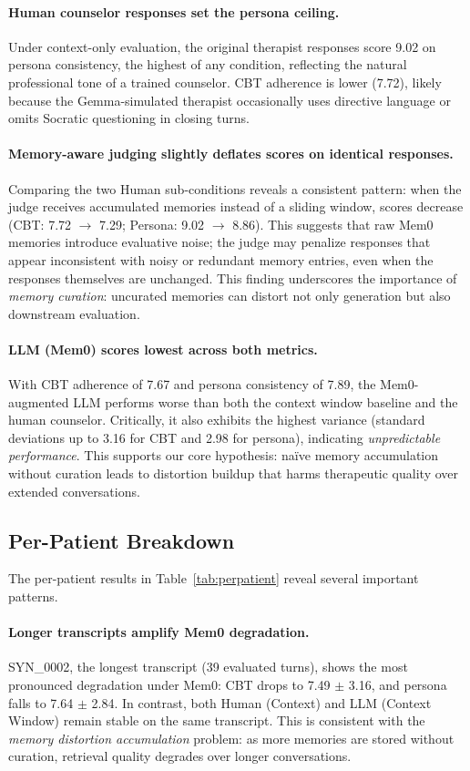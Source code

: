 \paragraph{Human counselor responses set the persona ceiling.} Under context-only evaluation, the original therapist responses score 9.02 on persona consistency, the highest of any condition, reflecting the natural professional tone of a trained counselor. CBT adherence is lower (7.72), likely because the Gemma-simulated therapist occasionally uses directive language or omits Socratic questioning in closing turns.

\paragraph{Memory-aware judging slightly deflates scores on identical responses.} Comparing the two Human sub-conditions reveals a consistent pattern: when the judge receives accumulated memories instead of a sliding window, scores decrease (CBT: 7.72 $\to$ 7.29; Persona: 9.02 $\to$ 8.86). This suggests that raw Mem0 memories introduce evaluative noise; the judge may penalize responses that appear inconsistent with noisy or redundant memory entries, even when the responses themselves are unchanged. This finding underscores the importance of \emph{memory curation}: uncurated memories can distort not only generation but also downstream evaluation.

\paragraph{LLM (Mem0) scores lowest across both metrics.} With CBT adherence of 7.67 and persona consistency of 7.89, the Mem0-augmented LLM performs worse than both the context window baseline and the human counselor. Critically, it also exhibits the highest variance (standard deviations up to 3.16 for CBT and 2.98 for persona), indicating \emph{unpredictable performance}. This supports our core hypothesis: na\"ive memory accumulation without curation leads to distortion buildup that harms therapeutic quality over extended conversations.

\subsection{Per-Patient Breakdown}

The per-patient results in Table~\ref{tab:perpatient} reveal several important patterns.

\paragraph{Longer transcripts amplify Mem0 degradation.} SYN\_0002, the longest transcript (39 evaluated turns), shows the most pronounced degradation under Mem0: CBT drops to 7.49 $\pm$ 3.16, and persona falls to 7.64 $\pm$ 2.84. In contrast, both Human (Context) and LLM (Context Window) remain stable on the same transcript. This is consistent with the \emph{memory distortion accumulation} problem: as more memories are stored without curation, retrieval quality degrades over longer conversations.

